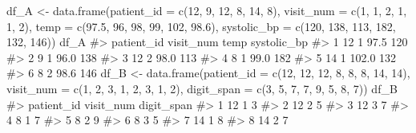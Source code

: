 \documentclass[
  letterpaper,
]{latex/krantz}
\makeatletter
\newenvironment{Shaded}{\begin{snugshade}}{\end{snugshade}}
\newcommand{\AttributeTok}[1]{\textcolor[rgb]{0.40,0.45,0.13}{#1}}
\newcommand{\CommentTok}[1]{\textcolor[rgb]{0.37,0.37,0.37}{#1}}
\newcommand{\DecValTok}[1]{\textcolor[rgb]{0.68,0.00,0.00}{#1}}
\newcommand{\FloatTok}[1]{\textcolor[rgb]{0.68,0.00,0.00}{#1}}
\newcommand{\FunctionTok}[1]{\textcolor[rgb]{0.28,0.35,0.67}{#1}}
\newcommand{\NormalTok}[1]{\textcolor[rgb]{0.00,0.23,0.31}{#1}}
\newcommand{\OtherTok}[1]{\textcolor[rgb]{0.00,0.23,0.31}{#1}}
\newenvironment{kframe}{%
\medskip{}
\setlength{\fboxsep}{.8em}
 \def\at@end@of@kframe{}%
 \ifinner\ifhmode%
  \def\at@end@of@kframe{\end{minipage}}%
  \begin{minipage}{\columnwidth}%
 \fi\fi%
 \def\FrameCommand##1{\hskip\@totalleftmargin \hskip-\fboxsep
 \colorbox{shadecolor}{##1}\hskip-\fboxsep
     \hskip-\linewidth \hskip-\@totalleftmargin \hskip\columnwidth}%
 \MakeFramed {\advance\hsize-\width
   \@totalleftmargin\z@ \linewidth\hsize
   \@setminipage}}%
 {\par\unskip\endMakeFramed%
 \at@end@of@kframe}
\renewenvironment{Shaded}{\begin{kframe}}{\end{kframe}}
\makeatother
\begin{document}
\begin{Shaded}
\begin{Highlighting}[]
\NormalTok{df\_A }\OtherTok{\textless{}{-}} \FunctionTok{data.frame}\NormalTok{(}\AttributeTok{patient\_id =} \FunctionTok{c}\NormalTok{(}\DecValTok{12}\NormalTok{, }\DecValTok{9}\NormalTok{, }\DecValTok{12}\NormalTok{, }\DecValTok{8}\NormalTok{, }\DecValTok{14}\NormalTok{, }\DecValTok{8}\NormalTok{), }
                  \AttributeTok{visit\_num =} \FunctionTok{c}\NormalTok{(}\DecValTok{1}\NormalTok{, }\DecValTok{1}\NormalTok{, }\DecValTok{2}\NormalTok{, }\DecValTok{1}\NormalTok{, }\DecValTok{1}\NormalTok{, }\DecValTok{2}\NormalTok{), }
                  \AttributeTok{temp =} \FunctionTok{c}\NormalTok{(}\FloatTok{97.5}\NormalTok{, }\DecValTok{96}\NormalTok{, }\DecValTok{98}\NormalTok{, }\DecValTok{99}\NormalTok{, }\DecValTok{102}\NormalTok{, }\FloatTok{98.6}\NormalTok{), }
                  \AttributeTok{systolic\_bp =} \FunctionTok{c}\NormalTok{(}\DecValTok{120}\NormalTok{, }\DecValTok{138}\NormalTok{, }\DecValTok{113}\NormalTok{, }\DecValTok{182}\NormalTok{, }\DecValTok{132}\NormalTok{, }\DecValTok{146}\NormalTok{))}
\NormalTok{df\_A}
\CommentTok{\#\textgreater{}   patient\_id visit\_num  temp systolic\_bp}
\CommentTok{\#\textgreater{} 1         12         1  97.5         120}
\CommentTok{\#\textgreater{} 2          9         1  96.0         138}
\CommentTok{\#\textgreater{} 3         12         2  98.0         113}
\CommentTok{\#\textgreater{} 4          8         1  99.0         182}
\CommentTok{\#\textgreater{} 5         14         1 102.0         132}
\CommentTok{\#\textgreater{} 6          8         2  98.6         146}
\NormalTok{df\_B }\OtherTok{\textless{}{-}} \FunctionTok{data.frame}\NormalTok{(}\AttributeTok{patient\_id =} \FunctionTok{c}\NormalTok{(}\DecValTok{12}\NormalTok{, }\DecValTok{12}\NormalTok{, }\DecValTok{12}\NormalTok{, }\DecValTok{8}\NormalTok{, }\DecValTok{8}\NormalTok{, }\DecValTok{8}\NormalTok{, }\DecValTok{14}\NormalTok{, }\DecValTok{14}\NormalTok{), }
                   \AttributeTok{visit\_num =} \FunctionTok{c}\NormalTok{(}\DecValTok{1}\NormalTok{, }\DecValTok{2}\NormalTok{, }\DecValTok{3}\NormalTok{, }\DecValTok{1}\NormalTok{, }\DecValTok{2}\NormalTok{, }\DecValTok{3}\NormalTok{, }\DecValTok{1}\NormalTok{, }\DecValTok{2}\NormalTok{),}
                   \AttributeTok{digit\_span =} \FunctionTok{c}\NormalTok{(}\DecValTok{3}\NormalTok{, }\DecValTok{5}\NormalTok{, }\DecValTok{7}\NormalTok{, }\DecValTok{7}\NormalTok{, }\DecValTok{9}\NormalTok{, }\DecValTok{5}\NormalTok{, }\DecValTok{8}\NormalTok{, }\DecValTok{7}\NormalTok{))}
\NormalTok{df\_B}
\CommentTok{\#\textgreater{}   patient\_id visit\_num digit\_span}
\CommentTok{\#\textgreater{} 1         12         1          3}
\CommentTok{\#\textgreater{} 2         12         2          5}
\CommentTok{\#\textgreater{} 3         12         3          7}
\CommentTok{\#\textgreater{} 4          8         1          7}
\CommentTok{\#\textgreater{} 5          8         2          9}
\CommentTok{\#\textgreater{} 6          8         3          5}
\CommentTok{\#\textgreater{} 7         14         1          8}
\CommentTok{\#\textgreater{} 8         14         2          7}
\end{Highlighting}
\end{Shaded}
\end{document}
